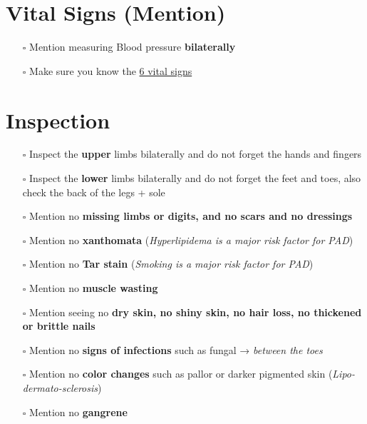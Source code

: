 \documentclass[
  13.5pt,
  a4paper,
  DIV=11,
  numbers=noendperiod]{scrreprt}
\providecommand{\tightlist}{%
  \setlength{\itemsep}{0pt}\setlength{\parskip}{0pt}}
\begin{document}
\section{Vital Signs (Mention)}\label{vital-signs-mention}

\begin{itemize}
\tightlist
\item[$\square$]
  Mention measuring Blood pressure \textbf{bilaterally}\\
\item[$\square$]
  Make sure you know the \href{miscellaneous.qmd}{6 vital signs}
\end{itemize}

\section{Inspection}\label{inspection-3}

\begin{itemize}
\tightlist
\item[$\square$]
  Inspect the \textbf{upper} limbs bilaterally and do not forget the
  hands and fingers\\
\item[$\square$]
  Inspect the \textbf{lower} limbs bilaterally and do not forget the
  feet and toes, also check the back of the legs + sole\\
\item[$\square$]
  Mention no \textbf{missing limbs or digits, and no scars and no
  dressings}\\
\item[$\square$]
  Mention no \textbf{xanthomata} (\emph{Hyperlipidema is a major risk
  factor for PAD})\\
\item[$\square$]
  Mention no \textbf{Tar stain} (\emph{Smoking is a major risk factor
  for PAD})\\
\item[$\square$]
  Mention no \textbf{muscle wasting}\\
\item[$\square$]
  Mention seeing no \textbf{dry skin, no shiny skin, no hair loss, no
  thickened or brittle nails}\\
\item[$\square$]
  Mention no \textbf{signs of infections} such as fungal → \emph{between
  the toes}\\
\item[$\square$]
  Mention no \textbf{color changes} such as pallor or darker pigmented
  skin (\emph{Lipo-dermato-sclerosis})\\
\item[$\square$]
  Mention no \textbf{gangrene}
\end{itemize}
\end{document}
